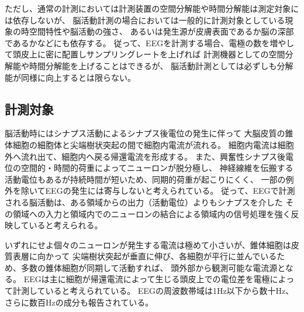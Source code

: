 ただし、通常の計測においては計測装置の空間分解能や時間分解能は測定対象には依存しないが、
脳活動計測の場合においては一般的に計測対象としている現象の時空間特性や脳活動の強さ、
あるいは発生源が皮膚表面であるか脳の深部であるかなどにも依存する。
従って、EEGを計測する場合、電極の数を増やして頭皮上に密に配置しサンプリングレートを上げれば
計測機器としての空間分解能や時間分解能を上げることはできるが、
脳活動計測としては必ずしも分解能が同様に向上するとは限らない。

\subsection{計測対象}
脳活動時にはシナプス活動によるシナプス後電位の発生に伴って
大脳皮質の錐体細胞の細胞体と尖端樹状突起の間で細胞内電流が流れる。
細胞内電流は細胞外へ流れ出て、細胞内へ戻る帰還電流を形成する。
また、興奮性シナプス後電位の空間的・時間的荷重によってニューロンが脱分極し、
神経線維を伝搬する活動電位もあるが持続時間が短いため、同期的荷重が起こりにくく、
一部の例外を除いてEEGの発生には寄与しないと考えられている。
従って、EEGで計測される脳活動は、ある領域からの出力（活動電位）よりもシナプスを介した
その領域への入力と領域内でのニューロンの結合による領域内の信号処理を強く反映していると考えられる。

いずれにせよ個々のニューロンが発生する電流は極めて小さいが、錐体細胞は皮質表層に向かって
尖端樹状突起が垂直に伸び、各細胞が平行に並んでいるため、多数の錐体細胞が同期して活動すれば、
頭外部から観測可能な電流源となる。
EEGは主に細胞が帰還電流によって生じる頭皮上での電位差を電極によって計測していると考えられている。
EEGの周波数帯域は1Hz以下から数十Hz、さらに数百Hzの成分も報告されている。

